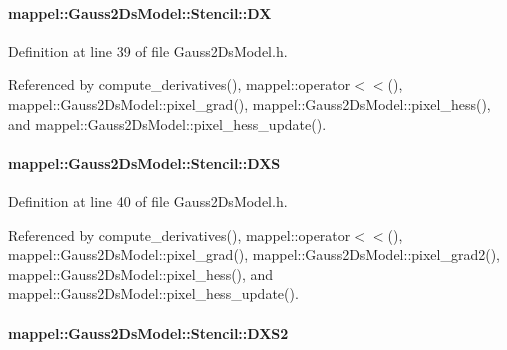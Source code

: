 \paragraph[{\texorpdfstring{DX}{DX}}]{ mappel\+::\+Gauss2\+Ds\+Model\+::\+Stencil\+::\+DX}\hypertarget{classmappel_1_1Gauss2DsModel_1_1Stencil_a6b89ca29dba3693054fff92b6ecfc59c}{}\label{classmappel_1_1Gauss2DsModel_1_1Stencil_a6b89ca29dba3693054fff92b6ecfc59c}


Definition at line 39 of file Gauss2\+Ds\+Model.\+h.



Referenced by compute\+\_\+derivatives(), mappel\+::operator$<$$<$(), mappel\+::\+Gauss2\+Ds\+Model\+::pixel\+\_\+grad(), mappel\+::\+Gauss2\+Ds\+Model\+::pixel\+\_\+hess(), and mappel\+::\+Gauss2\+Ds\+Model\+::pixel\+\_\+hess\+\_\+update().

\paragraph[{\texorpdfstring{D\+XS}{DXS}}]{ mappel\+::\+Gauss2\+Ds\+Model\+::\+Stencil\+::\+D\+XS}\hypertarget{classmappel_1_1Gauss2DsModel_1_1Stencil_aa10f9d644846ea246832b3850707b700}{}\label{classmappel_1_1Gauss2DsModel_1_1Stencil_aa10f9d644846ea246832b3850707b700}


Definition at line 40 of file Gauss2\+Ds\+Model.\+h.



Referenced by compute\+\_\+derivatives(), mappel\+::operator$<$$<$(), mappel\+::\+Gauss2\+Ds\+Model\+::pixel\+\_\+grad(), mappel\+::\+Gauss2\+Ds\+Model\+::pixel\+\_\+grad2(), mappel\+::\+Gauss2\+Ds\+Model\+::pixel\+\_\+hess(), and mappel\+::\+Gauss2\+Ds\+Model\+::pixel\+\_\+hess\+\_\+update().

\paragraph[{\texorpdfstring{D\+X\+S2}{DXS2}}]{ mappel\+::\+Gauss2\+Ds\+Model\+::\+Stencil\+::\+D\+X\+S2}\hypertarget{classmappel_1_1Gauss2DsModel_1_1Stencil_a96208f4eb9459d411a4731f6fb6f92cc}{}\label{classmappel_1_1Gauss2DsModel_1_1Stencil_a96208f4eb9459d411a4731f6fb6f92cc}


